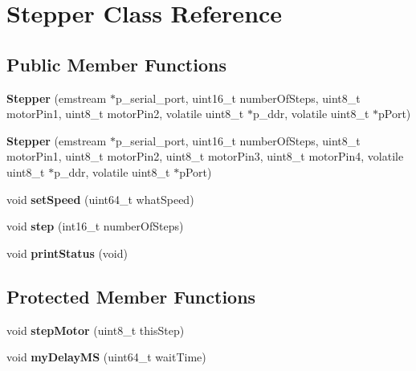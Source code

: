 \hypertarget{classStepper}{\section{\-Stepper \-Class \-Reference}
\label{classStepper}
}
\subsection*{\-Public \-Member \-Functions}
\begin{DoxyCompactItemize}
\item 
\hypertarget{classStepper_a18b6de3448354b4c7c249db7e680553b}{{\bfseries \-Stepper} (emstream $\ast$p\-\_\-serial\-\_\-port, uint16\-\_\-t number\-Of\-Steps, uint8\-\_\-t motor\-Pin1, uint8\-\_\-t motor\-Pin2, volatile uint8\-\_\-t $\ast$p\-\_\-ddr, volatile uint8\-\_\-t $\ast$p\-Port)}\label{classStepper_a18b6de3448354b4c7c249db7e680553b}

\item 
\hypertarget{classStepper_a253749a1db48e7df6756cc4dff826789}{{\bfseries \-Stepper} (emstream $\ast$p\-\_\-serial\-\_\-port, uint16\-\_\-t number\-Of\-Steps, uint8\-\_\-t motor\-Pin1, uint8\-\_\-t motor\-Pin2, uint8\-\_\-t motor\-Pin3, uint8\-\_\-t motor\-Pin4, volatile uint8\-\_\-t $\ast$p\-\_\-ddr, volatile uint8\-\_\-t $\ast$p\-Port)}\label{classStepper_a253749a1db48e7df6756cc4dff826789}

\item 
\hypertarget{classStepper_a5780b8ff7c703c074b33e76aac3f37cb}{void {\bfseries set\-Speed} (uint64\-\_\-t what\-Speed)}\label{classStepper_a5780b8ff7c703c074b33e76aac3f37cb}

\item 
\hypertarget{classStepper_a835c79cb881d633dd70210170184f041}{void {\bfseries step} (int16\-\_\-t number\-Of\-Steps)}\label{classStepper_a835c79cb881d633dd70210170184f041}

\item 
\hypertarget{classStepper_a78c1308c78834362382e6ea8a92a4b46}{void {\bfseries print\-Status} (void)}\label{classStepper_a78c1308c78834362382e6ea8a92a4b46}

\end{DoxyCompactItemize}
\subsection*{\-Protected \-Member \-Functions}
\begin{DoxyCompactItemize}
\item 
\hypertarget{classStepper_a0670296a732687b8dfee43b73803858e}{void {\bfseries step\-Motor} (uint8\-\_\-t this\-Step)}\label{classStepper_a0670296a732687b8dfee43b73803858e}

\item 
\hypertarget{classStepper_a1ff593eaf8ee55d848ca52f214f96cdc}{void {\bfseries my\-Delay\-M\-S} (uint64\-\_\-t wait\-Time)}\label{classStepper_a1ff593eaf8ee55d848ca52f214f96cdc}

\end{DoxyCompactItemize}
